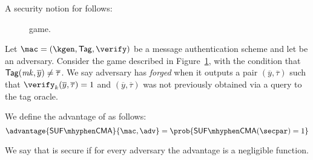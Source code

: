 A security notion for \mac{} follows:

\begin{figure}
    \centering
    \caption{\sufcma{} game.}\label{fig:sufcma}
\end{figure}

\begin{definition}
    Let $\mac = (\kgen,\tagg, \verify)$ be a message authentication scheme and let \adv{} be an adversary. Consider the \sufcma{} game described in Figure~\ref{fig:sufcma}, with the condition that $\mathsf{Tag} (\mathit{mk}, \overline{y}) \neq \overline{\tau}$. We say adversary \adv{} has \emph{forged} when it outputs a pair $(\overline{y}, \overline{\tau})$ such that $\verify_k(\overline{y},\overline{\tau}) = 1$ and $(\overline{y},\overline{\tau})$ was not previously obtained via a query to the tag oracle.

    We define the \sufcma{} advantage of \adv{} as follows:
    \[
        \advantage{\sufcma}{\mac, \adv} =  \prob{\sufcma(\secpar) = 1}
    \]

    We say that \mac{} is \sufcma{} secure if for every \ppt{} adversary \adv{} the advantage \advantage{\sufcma}{\mac, \adv} is a negligible function.
\end{definition}
